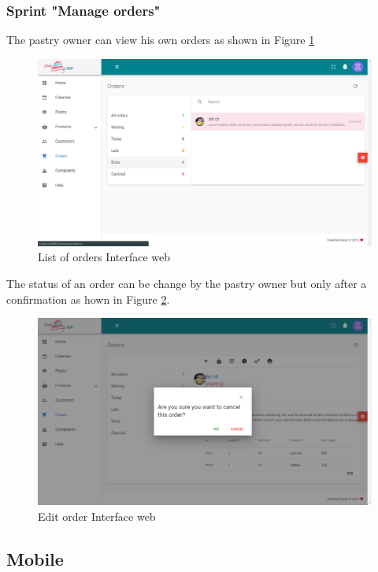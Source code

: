 \documentclass[12pt,a4paper]{report}
\begin{document}
\subsubsection*{Sprint "Manage orders"}
The pastry owner can view his own orders as shown in Figure \ref{orderslist-interface}
\begin{figure}[H]
	\centering
	\includegraphics[width=6in,keepaspectratio]{orderslist.png}
	\caption{List of orders Interface web}
	\label{orderslist-interface}
\end{figure}
The status of an order can be change by the pastry owner but only after a confirmation as hown in Figure \ref{changestate-interface}.
\begin{figure}[H]
	\centering
	\includegraphics[width=6in,keepaspectratio]{changestate.png}
	\caption{Edit order Interface web}
	\label{changestate-interface}
\end{figure}

\subsection{Mobile}
\end{document}
